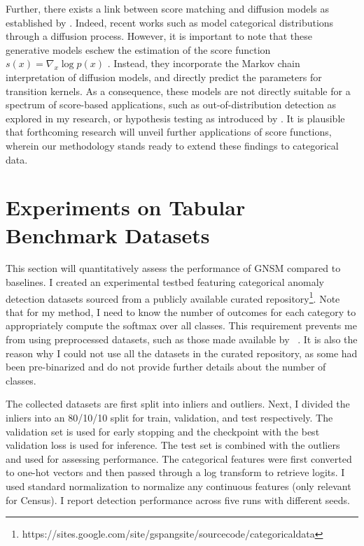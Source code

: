 Further, there exists a link between score matching and diffusion models as established by \cite{song2020score}. Indeed, recent works such as \cite{structured, argmax} model categorical distributions through a diffusion process. However, it is important to note that these generative models eschew the estimation of the score function $s(x) = \nabla_x \log p(x)$ . Instead, they incorporate the Markov chain interpretation of diffusion models, and directly predict the parameters for transition kernels. As a consequence, these models are not directly suitable for a spectrum of score-based applications, such as out-of-distribution detection as explored in my research, or hypothesis testing as introduced by \cite{hypothesis}. It is plausible that forthcoming research will unveil further applications of score functions, wherein our methodology stands ready to extend these findings to categorical data. 

\section{Experiments on Tabular Benchmark Datasets}\label{sec:gnsm_experiments}

This section will quantitatively assess the performance of GNSM compared to baselines. I created an experimental testbed featuring categorical anomaly detection datasets sourced from a publicly available curated repository\footnote{\scriptsize https://sites.google.com/site/gspangsite/sourcecode/categoricaldata}. Note that for my method, I need to know the number of outcomes for each category to appropriately compute the softmax over all classes. This requirement prevents me from using preprocessed datasets, such as those made available by ~\cite{han2022adbench}. It is also the reason why I could not use all the datasets in the curated repository, as some had been pre-binarized and do not provide further details about the number of classes.

The collected datasets are first split into inliers and outliers. Next, I divided the inliers into an 80/10/10 split for train, validation, and test respectively. The validation set is used for early stopping and the checkpoint with the best validation loss is used for inference. The test set is combined with the outliers and used for assessing performance. The categorical features were first converted to one-hot vectors and then passed through a log transform to retrieve logits. I used standard normalization to normalize any continuous features (only relevant for Census). I report detection performance across five runs with different seeds.


